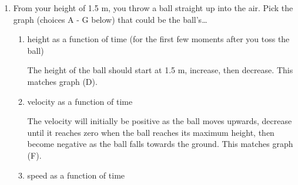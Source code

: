 \documentclass{article}
\begin{document}
\begin{enumerate}
  \pspace{\newpage}

\item 


  From your height of 1.5 m, you throw a ball straight up into the air. Pick the graph (choices A - G below) that could be the ball's\ldots
  \begin{enumerate}
  \item
    \begin{problem}[\vfill]
      height as a function of time (for the first few moments after you toss the ball)
    \end{problem}

    \begin{solution}
      The height of the ball should start at 1.5 m, increase, then decrease. This matches
      graph (D).
    \end{solution}

  \item
    \begin{problem}[\vfill]
      velocity as a function of time
    \end{problem}

    \begin{solution}
      The velocity will initially be positive as the ball moves upwards, decrease until it reaches
      zero when the ball reaches its maximum height, then become negative as the ball falls towards
      the ground.
      This matches graph (F).
    \end{solution}

  \item
    \begin{problem}[\vfill]
      speed as a function of time
    \end{problem}


\end{enumerate}
\end{enumerate}
\end{document}
